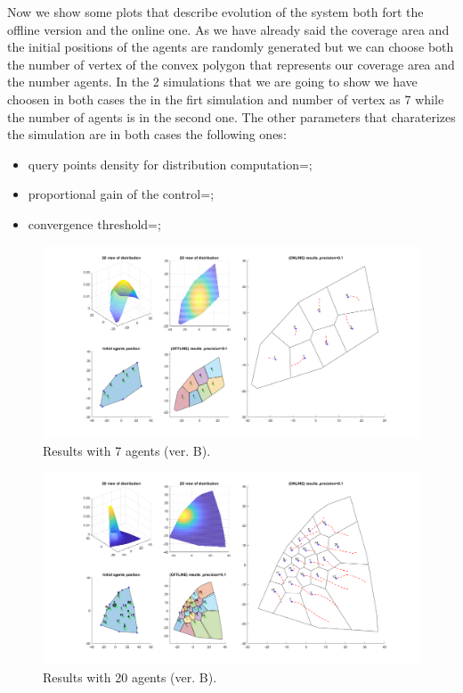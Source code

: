 \documentclass[a4paper,11pt,oneside]{book}
\begin{document}
	Now we show some plots that describe evolution of the system both fort the offline version and the online one. As we have already said the coverage area and the initial positions of the agents are randomly generated but we can choose both the number of vertex of the convex polygon that represents our coverage area and the number agents. In the 2 simulations that we are going to show we have choosen in both cases the  in the firt simulation and number of vertex as 7 while the number of agents is in the second one.
	The other parameters that charaterizes the simulation are in both cases the following ones:
	
	\begin{itemize}
		\item query points density for distribution computation=;
		\item proportional gain of the control=;
		\item convergence threshold=;

	\end{itemize}
	
	\begin{figure}	[H]
		\centering	
		\includegraphics[scale=0.45,angle=90]{figs/convergenceResultsB.png}
		\caption{Results with 7 agents (ver. B).}\label{fig:convergenceResultsB.png}	
	\end{figure}
	
	\begin{figure}[H]
		\centering	
		\includegraphics[scale=0.45, angle=90]{figs/20convergenceResultsB.png}
		\caption{Results with 20 agents (ver. B).}\label{fig:20convergenceResultsB.png}	
	\end{figure}
	
\end{document}
